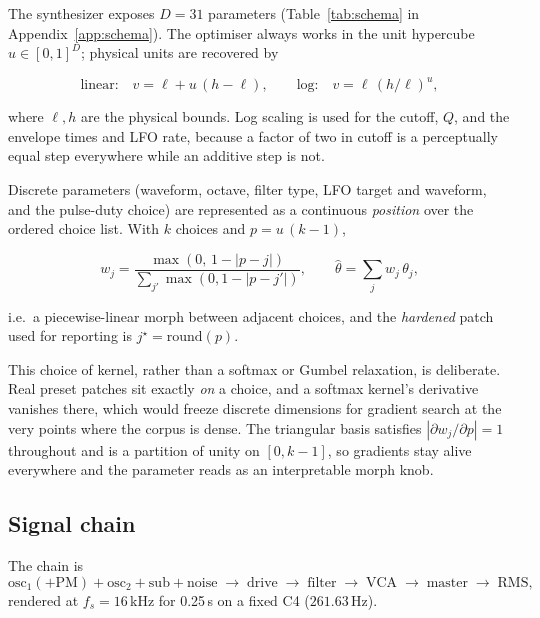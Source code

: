 \documentclass[11pt]{article}
\begin{document}
The synthesizer exposes $D=31$ parameters (Table~\ref{tab:schema} in
Appendix~\ref{app:schema}). The optimiser always works in the unit hypercube
$u \in [0,1]^{D}$; physical units are recovered by

\begin{equation}
\text{linear:}\quad v = \ell + u\,(h - \ell), \qquad
\text{log:}\quad v = \ell\,(h/\ell)^{u},
\end{equation}

where $\ell,h$ are the physical bounds. Log scaling is used for the cutoff, $Q$,
and the envelope times and LFO rate, because a factor of two in cutoff is a
perceptually equal step everywhere while an additive step is not.

Discrete parameters (waveform, octave, filter type, LFO target and waveform, and
the pulse-duty choice) are represented as a continuous \emph{position} over the
ordered choice list. With $k$ choices and $p = u\,(k-1)$,

\begin{equation}
w_j = \frac{\max\left(0,\,1 - |p - j|\right)}{\sum_{j'}\max(0, 1 - |p - j'|)},
\qquad
\hat\theta = \sum_j w_j\,\theta_j,
\label{eq:choice}
\end{equation}

i.e.\ a piecewise-linear morph between adjacent choices, and the \emph{hardened}
patch used for reporting is $j^\star = \mathrm{round}(p)$.

This choice of kernel, rather than a softmax or Gumbel relaxation, is
deliberate. Real preset patches sit exactly \emph{on} a choice, and a softmax
kernel's derivative vanishes there, which would freeze discrete dimensions for
gradient search at the very points where the corpus is dense. The triangular
basis satisfies $|\partial w_j/\partial p| = 1$ throughout and is a partition of
unity on $[0, k-1]$, so gradients stay alive everywhere and the parameter reads
as an interpretable morph knob.

\subsection{Signal chain}\label{sec:chain}

The chain is
\begin{equation}
\text{osc}_1(\text{+PM}) + \text{osc}_2 + \text{sub} + \text{noise}
\;\rightarrow\; \text{drive} \;\rightarrow\; \text{filter} \;\rightarrow\;
\text{VCA} \;\rightarrow\; \text{master} \;\rightarrow\; \text{RMS},
\end{equation}
rendered at $f_s = 16$\,kHz for 0.25\,s on a fixed C4 ($261.63$\,Hz).
\end{document}

